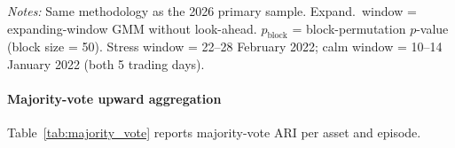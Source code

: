 \documentclass[preprint,12pt,authoryear]{elsarticle}
\newcommand{\CL}{CL}
\newcommand{\GLD}{GLD}
\begin{document}
\begin{table}[H]
\centering
\small
\setlength{\tabcolsep}{4pt}
\caption{Out-of-sample validation: 2022 Russia--Ukraine episode (December 2021 -- May 2022). \CL{} omitted because IB \texttt{CONTFUT} historical service does not retain pre-2024 5m data; \GLD{} provides commodity-class coverage.}
\label{tab:oos_2022}
\par\medskip
{\footnotesize\justifying
\textit{Notes:} Same methodology as the 2026 primary sample. Expand.\ window = expanding-window GMM without look-ahead. $p_{\text{block}}$ = block-permutation $p$-value (block size = 50). Stress window = 22--28 February 2022; calm window = 10--14 January 2022 (both 5 trading days).
\par}
\end{table}

\paragraph{Majority-vote upward aggregation}
Table~\ref{tab:majority_vote} reports majority-vote ARI per asset and episode.
\end{document}

